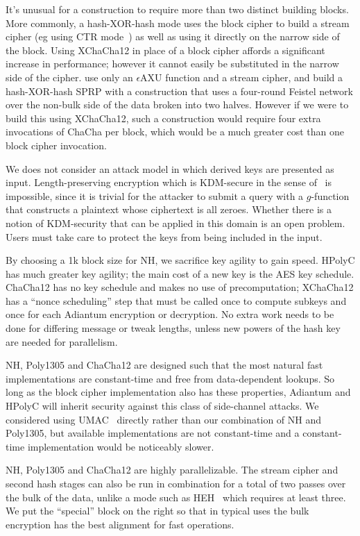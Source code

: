 \documentclass[journal=tosc,preprint,floatrow,submission]{iacrtrans}
\begin{document}
It's unusual for a construction to require more than two distinct building blocks.
More commonly, a hash-XOR-hash mode uses the block cipher to build a stream cipher
(eg using CTR mode~\cite{ctr})
as well as using it directly on the narrow side of the block.
Using XChaCha12 in place of a block cipher affords a significant increase in performance;
however it cannot easily be substituted in the narrow side of the cipher.
\cite{sarkar1,sarkar2,sarkar3,sarkar4} use only an $\epsilon$AXU function
and a stream cipher, and build a hash-XOR-hash SPRP
with a construction that uses a four-round Feistel network over the non-bulk side of the data
broken into two halves. However if we were to build this using XChaCha12,
such a construction would require four extra invocations of ChaCha per block, which would be
a much greater cost than one block cipher invocation.

We does not consider an attack model in which derived keys are presented as input.
Length-preserving encryption
which is KDM-secure in the sense of~\cite{kdm} is impossible, since it is trivial for the
attacker to submit a query with a $g$-function
that constructs a plaintext whose ciphertext is all zeroes.
Whether there is a notion of KDM-security that can be
applied in this domain is an open problem. Users must take care to protect the keys from being
included in the input.

By choosing a 1k block size for NH, we sacrifice key agility to gain speed. HPolyC
has much greater key agility; the main cost of a new key is the AES key schedule.
ChaCha12 has no key schedule and makes no use of
precomputation; XChaCha12 has a ``nonce scheduling'' step that
must be called once to compute subkeys and once for each Adiantum encryption or decryption.
No extra work needs to be done for differing message or tweak lengths, unless
new powers of the hash key are needed for parallelism.

NH, Poly1305 and ChaCha12 are designed such that the most natural fast implementations are
constant-time and free from data-dependent lookups. So long as the block cipher implementation
also has these properties, Adiantum and HPolyC will inherit security against
this class of side-channel attacks. We considered using UMAC~\cite{rfc4418} directly
rather than our combination
of NH and Poly1305, but available implementations are not constant-time
and a constant-time implementation
would be noticeably slower.

NH, Poly1305 and ChaCha12 are highly parallelizable.
The stream cipher and second hash stages can also be run in combination for a total
of two passes over the bulk of the data, unlike a mode such as HEH~\cite{heh}
which requires at least three.
We put the ``special'' block on the right so that in typical uses the bulk encryption has
the best alignment for fast operations.
\end{document}
